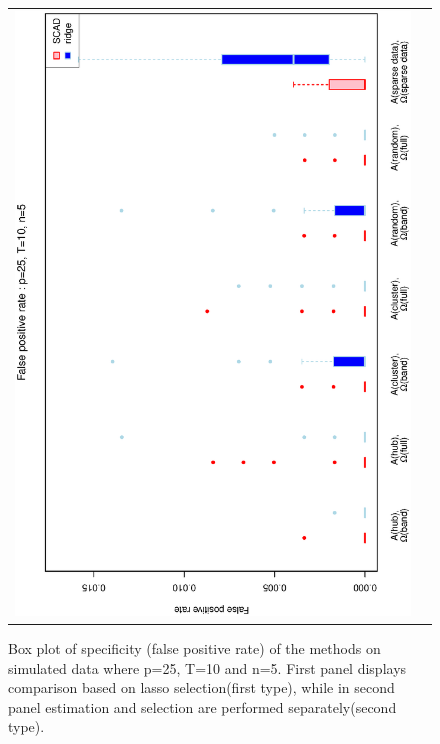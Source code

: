 \documentclass[a4paper]{article}
\begin{document}
\begin{figure}[htb!]
\begin{tabular}{cc}
\includegraphics[scale=0.5,angle=270]{ROCfpr25T10N5b.eps}\\
\end{tabular}
\caption{Box plot of specificity (false positive rate) of the methods on simulated data where p=25, T=10 and n=5. First panel displays comparison based on lasso selection(first type), while in second panel estimation and selection are performed separately(second type).}
\label{fig:fpr25T10N5}
\end{figure}
\end{document}
